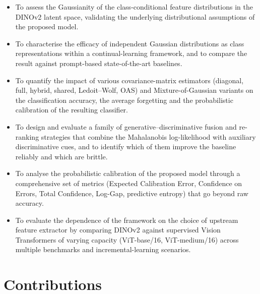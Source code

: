 \begin{itemize}
	\item To assess the Gaussianity of the class-conditional feature distributions in the DINOv2 latent space, validating the underlying distributional assumptions of the proposed model.
	\item To characterise the efficacy of independent Gaussian distributions as class representations within a continual-learning framework, and to compare the result against prompt-based state-of-the-art baselines.
	\item To quantify the impact of various covariance-matrix estimators (diagonal, full, hybrid, shared, Ledoit--Wolf, OAS) and Mixture-of-Gaussian variants on the classification accuracy, the average forgetting and the probabilistic calibration of the resulting classifier.
	\item To design and evaluate a family of generative--discriminative fusion and re-ranking strategies that combine the Mahalanobis log-likelihood with auxiliary discriminative cues, and to identify which of them improve the baseline reliably and which are brittle.
	\item To analyse the probabilistic calibration of the proposed model through a comprehensive set of metrics (Expected Calibration Error, Confidence on Errors, Total Confidence, Log-Gap, predictive entropy) that go beyond raw accuracy.
	\item To evaluate the dependence of the framework on the choice of upstream feature extractor by comparing DINOv2 against supervised Vision Transformers of varying capacity (ViT-base/16, ViT-medium/16) across multiple benchmarks and incremental-learning scenarios.
\end{itemize}

\section{Contributions}

